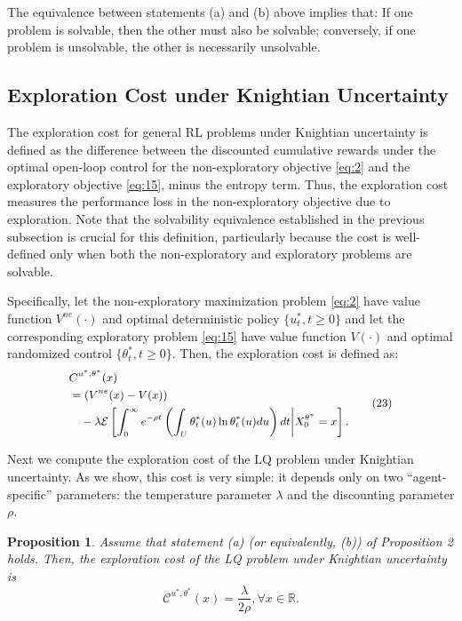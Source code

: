 \documentclass[onecolumn, journal]{IEEEtran} %
\newtheorem{proposition}{Proposition}
\begin{document}
	The equivalence between statements (a) and (b) above implies that: If one problem is solvable, then the other must also be solvable; conversely, if one problem is unsolvable, the other is necessarily unsolvable.
	\subsection{Exploration Cost under Knightian Uncertainty}
	
	The exploration cost for general RL problems under Knightian uncertainty is defined as the difference between the discounted cumulative rewards under the optimal open-loop control for the non-exploratory objective \eqref{eq:2} and the exploratory objective \eqref{eq:15}, minus the entropy term. Thus, the exploration cost measures the performance loss in the non-exploratory objective due to exploration. Note that the solvability equivalence established in the previous subsection is crucial for this definition, particularly because the cost is well-defined only when both the non-exploratory and exploratory problems are solvable.
	
	Specifically, let the non-exploratory maximization problem \eqref{eq:2} have value function $V^{ne}(\cdot)$ and optimal deterministic policy $\{u_t^*, t \geq 0\}$ and let the corresponding exploratory problem \eqref{eq:15} have value function $V(\cdot)$ and optimal randomized control $\{\theta_t^*, t \geq 0\}$. Then, the exploration cost is defined as:
	\begin{equation}\label{eq:23}
		\small %
		\begin{aligned}
			&C^{u^*, \theta^*}(x)\\
			&= \left( V^{ne}(x) - V(x) \right) \\
			&\quad - \lambda \mathcal{E} \left[ \int_0^\infty e^{-\rho t} \left( \int_U \theta_t^*(u) \ln \theta_t^*(u) du \right) dt \bigg| X_0^{\theta^*} = x \right].
		\end{aligned}
		\tag{23}
	\end{equation}
	
	Next we compute the exploration cost of the LQ problem under Knightian uncertainty. As we show, this cost is very simple: it depends only on two ``agent-specific'' parameters: the temperature parameter $\lambda$ and the discounting parameter $\rho$.
	\begin{proposition}
		Assume that statement (a) (or equivalently, (b)) of Proposition 2 holds. Then, the exploration cost of the LQ problem under Knightian uncertainty is
		\[
		\mathcal{C}^{u^*, \theta^*}(x) = \frac{\lambda}{2\rho}, \forall x \in \mathbb{R}.
		\]
	\end{proposition}
	
\end{document}
